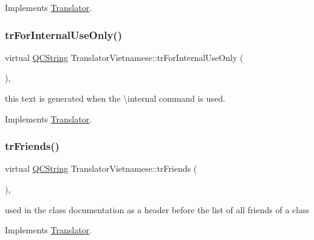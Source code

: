 Implements \mbox{\hyperlink{class_translator}{Translator}}.

\mbox{\label{class_translator_vietnamese_aeb62b14bc5222d566b1f3b750e53af11}} 
\subsubsection{\texorpdfstring{trForInternalUseOnly()}{trForInternalUseOnly()}}
{\footnotesize\ttfamily virtual \mbox{\hyperlink{class_q_c_string}{Q\+C\+String}} Translator\+Vietnamese\+::tr\+For\+Internal\+Use\+Only (\begin{DoxyParamCaption}{ }\end{DoxyParamCaption})\hspace{0.3cm}{\ttfamily [inline]}, {\ttfamily [virtual]}}

this text is generated when the \textbackslash{}internal command is used. 

Implements \mbox{\hyperlink{class_translator}{Translator}}.

\mbox{\label{class_translator_vietnamese_a243a24481a6730ce4d65d2e78bd7d485}} 
\subsubsection{\texorpdfstring{trFriends()}{trFriends()}}
{\footnotesize\ttfamily virtual \mbox{\hyperlink{class_q_c_string}{Q\+C\+String}} Translator\+Vietnamese\+::tr\+Friends (\begin{DoxyParamCaption}{ }\end{DoxyParamCaption})\hspace{0.3cm}{\ttfamily [inline]}, {\ttfamily [virtual]}}

used in the class documentation as a header before the list of all friends of a class 

Implements \mbox{\hyperlink{class_translator}{Translator}}.

\mbox{\label{class_translator_vietnamese_a7971993f31cb88a403bc347a6f8b8558}} 
